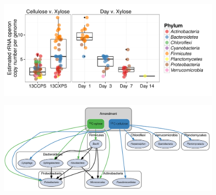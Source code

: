 \begin{figure}[H] \begin{center}
\centerline{\includegraphics[width=\textwidth]{figures/copy_number/copy_number.pdf}}
\caption{\protect}\label{fig:copy}
\end{center} \end{figure}

\begin{figure}[H]
	\begin{center}
    \centerline{\includegraphics[width=\textwidth]{figures/foodweb/foodweb.png}}
    \caption{\protect}\label{fig:foodweb}
    \end{center} 
\end{figure}

